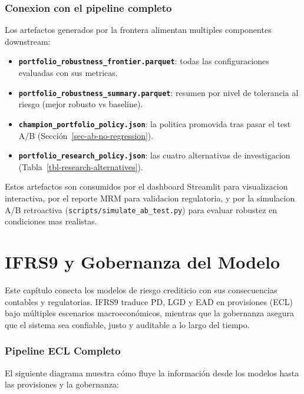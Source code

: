 \documentclass[
  spanish,
  11pt,
  letterpaper,
]{scrbook}
\providecommand{\tightlist}{%
  \setlength{\itemsep}{0pt}\setlength{\parskip}{0pt}}
\theoremstyle{plain}
\theoremstyle{remark}
\begin{document}
\subsection{Conexion con el pipeline
completo}\label{conexion-con-el-pipeline-completo}

Los artefactos generados por la frontera alimentan multiples componentes
downstream:

\begin{itemize}
\tightlist
\item
  \textbf{\texttt{portfolio\_robustness\_frontier.parquet}}: todas las
  configuraciones evaluadas con sus metricas.
\item
  \textbf{\texttt{portfolio\_robustness\_summary.parquet}}: resumen por
  nivel de tolerancia al riesgo (mejor robusto vs baseline).
\item
  \textbf{\texttt{champion\_portfolio\_policy.json}}: la politica
  promovida tras pasar el test A/B (Sección~\ref{sec-ab-no-regression}).
\item
  \textbf{\texttt{portfolio\_research\_policy.json}}: las cuatro
  alternativas de investigacion (Tabla~\ref{tbl-research-alternatives}).
\end{itemize}

Estos artefactos son consumidos por el dashboard Streamlit para
visualizacion interactiva, por el reporte MRM para validacion
regulatoria, y por la simulacion A/B retroactiva
(\texttt{scripts/simulate\_ab\_test.py}) para evaluar robustez en
condiciones mas realistas.

\chapter{IFRS9 y Gobernanza del
Modelo}\label{ifrs9-y-gobernanza-del-modelo}

Este capítulo conecta los modelos de riesgo crediticio con sus
consecuencias contables y regulatorias. IFRS9 traduce PD, LGD y EAD en
provisiones (ECL) bajo múltiples escenarios macroeconómicos, mientras
que la gobernanza asegura que el sistema sea confiable, justo y
auditable a lo largo del tiempo.

\subsection{Pipeline ECL Completo}\label{pipeline-ecl-completo}

El siguiente diagrama muestra cómo fluye la información desde los
modelos hasta las provisiones y la gobernanza:
\end{document}
